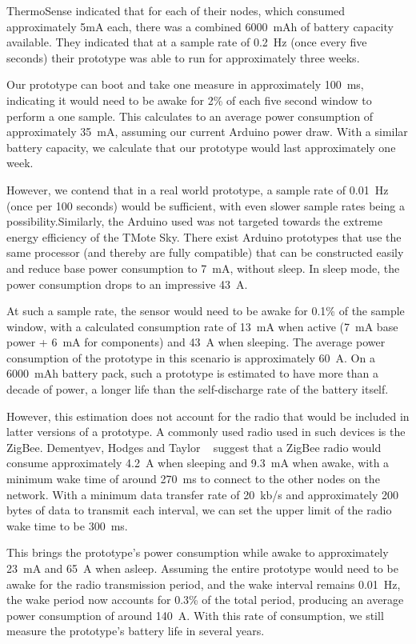 \documentclass[../thesis/thesis.tex]{subfiles}
\begin{document}
ThermoSense indicated that for each of their nodes, which consumed approximately 5mA each, there was a combined 6000~mAh of battery capacity available. They indicated that at a sample rate of 0.2~Hz (once every five seconds) their prototype was able to run for approximately three weeks.

Our prototype can boot and take one measure in approximately 100~ms, indicating it would need to be awake for 2\% of each five second window to perform a one sample. This calculates to an average power consumption of approximately 35~mA, assuming our current Arduino power draw. With a similar battery capacity, we calculate that our prototype would last approximately one week.

However, we contend that in a real world prototype, a sample rate of 0.01~Hz (once per 100 seconds) would be sufficient, with even slower sample rates being a possibility.Similarly, the Arduino used was not targeted towards the extreme energy efficiency of the TMote Sky. There exist Arduino prototypes that use the same processor (and thereby are fully compatible) that can be constructed easily and reduce base power consumption to 7~mA, without sleep. In sleep mode, the power consumption drops to an impressive 43~\textmu A. %

At such a sample rate, the sensor would need to be awake for 0.1\% of the sample window, with a calculated consumption rate of 13~mA when active (7~mA base power + 6~mA for components) and 43~\textmu A when sleeping. The average power consumption of the prototype in this scenario is approximately 60~\textmu A. On a 6000~mAh battery pack, such a prototype is estimated to have more than a decade of power, a longer life than the self-discharge rate of the battery itself.

However, this estimation does not account for the radio that would be included in latter versions of a prototype. A commonly used radio used in such devices is the ZigBee. Dementyev, Hodges and Taylor \etal~\cite{dementyev2013power} suggest that a ZigBee radio would consume approximately 4.2~\textmu A when sleeping and 9.3~mA when awake, with a minimum wake time of around 270~ms to connect to the other nodes on the network. With a minimum data transfer rate of 20~kb/s and approximately 200 bytes of data to transmit each interval, we can set the upper limit of the radio wake time to be 300~ms.

This brings the prototype's power consumption while awake to approximately 23~mA and 65~\textmu A when asleep. Assuming the entire prototype would need to be awake for the radio transmission period, and the wake interval remains 0.01~Hz, the wake period now accounts for 0.3\% of the total period, producing an average power consumption of around 140~\textmu A. With this rate of consumption, we still measure the prototype's battery life in several years.

\end{document}
